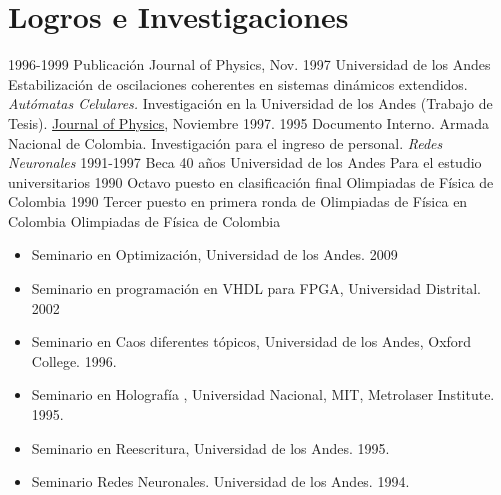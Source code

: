 \section{Logros e Investigaciones}
\begin{entrylist}
  \entry
    {1996-1999}
    {Publicación Journal of Physics, Nov. 1997}
    {Universidad de los Andes}
    {Estabilización de oscilaciones coherentes en sistemas dinámicos extendidos.
     {\sl Autómatas Celulares.} Investigación en la Universidad de los Andes (Trabajo de Tesis).
     \href{http://link.aps.org/abstract/PRE/v56/p2276}{Journal of Physics}, Noviembre 1997.}
  \entry
    {1995}
    {Documento Interno.}
    {Armada Nacional de Colombia.}
    {Investigación para el ingreso de personal. {\sl Redes Neuronales}}
  \entry
    {1991-1997}
    {Beca 40 años}
    {Universidad de los Andes}
    {Para el estudio universitarios}
  \entry
    {1990}
    {Octavo puesto en clasificación final}
    {Olimpiadas de Física de Colombia}{}
  \entry
    {1990}
    {Tercer puesto en primera ronda de Olimpiadas de Física en Colombia}
    {Olimpiadas de Física de Colombia}{}
\end{entrylist}

  \begin{itemize}
  \item{Seminario en Optimización, Universidad de los Andes. 2009}
  \item{Seminario en programación en VHDL para FPGA, Universidad Distrital. 2002}
  \item{Seminario en Caos diferentes tópicos, Universidad de los Andes, Oxford College. 1996.}
  \item{Seminario en Holografía , Universidad Nacional, MIT, Metrolaser Institute. 1995.}
  \item{Seminario en Reescritura, Universidad de los Andes. 1995.}
  \item{Seminario Redes Neuronales. Universidad de los Andes. 1994.}
  \end{itemize}
